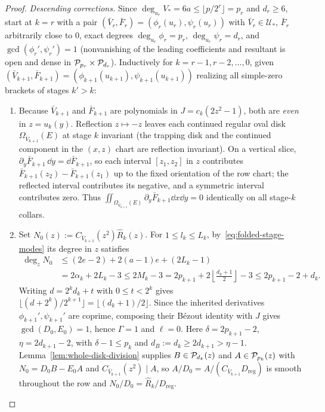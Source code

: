 \begin{proof}
\emph{Descending corrections.} Since $\deg_{u_r} V_* = 6a \le \lfloor p/2^r\rfloor = p_r$ and $d_r\ge 6$, start at $k=r$ with a pair $(\bar{V}_r,\bar{F}_r)=(\phi_r(u_r),\psi_r(u_r))$ with $\bar{V}_r\in\mathcal{U}_*$, $\bar{F}_r$ arbitrarily close to $0$, exact degrees $\deg_{u_r}\phi_r=p_r$, $\deg_{u_r}\psi_r=d_r$, and $\gcd(\phi_r',\psi_r')=1$ (nonvanishing of the leading coefficients and resultant is open and dense in $\mathcal{P}_{p_r}\times\mathcal{P}_{d_r}$). Inductively for $k=r-1,r-2,\dots,0$, given $(\bar{V}_{k+1},\bar{F}_{k+1})=(\phi_{k+1}(u_{k+1}),\psi_{k+1}(u_{k+1}))$ realizing all simple-zero brackets of stages $k'>k$:
\begin{enumerate}[label=\arabic*.,nosep]
  \item Because $\bar{V}_{k+1}$ and $\bar{F}_{k+1}$ are polynomials in $J=c_k(2z^2-1)$, both are \emph{even} in $z=u_k(y)$. Reflection $z\mapsto -z$ leaves each continued regular oval disk $\Omega_{\bar{V}_{k+1}}(E)$ at stage $k$ invariant (the trapping disk and the continued component in the $(x,z)$ chart are reflection invariant). On a vertical slice, $\partial_y\bar F_{k+1}\,\dd y=\dd\bar F_{k+1}$, so each interval $[z_1,z_2]$ in $z$ contributes $\bar F_{k+1}(z_2)-\bar F_{k+1}(z_1)$ up to the fixed orientation of the row chart; the reflected interval contributes its negative, and a symmetric interval contributes zero. Thus $\iint_{\Omega_{\bar{V}_{k+1}}(E)}\partial_y\bar{F}_{k+1}\dd x\dd y=0$ identically on all stage-$k$ collars.
  \item Set $N_0(z):=C_{\bar{V}_{k+1}}(z^2)\widehat{R}_k(z)$. For $1\le l_k\le L_k$, by~\eqref{eq:folded-stage-modes} its degree in $z$ satisfies
  \begin{align*}
    \deg_z N_0 &\le (2e-2) + 2(a-1)e + (2L_k-1) \\
    &= 2\alpha_k + 2L_k - 3 \le 2M_k - 3
     = 2p_{k+1} + 2\left\lfloor\frac{d_k+1}{2}\right\rfloor - 3 \le 2p_{k+1} - 2 + d_k.
  \end{align*}
  Writing $d=2^kd_k+t$ with $0\le t<2^k$ gives $\lfloor(d+2^k)/2^{k+1}\rfloor=\lfloor(d_k+1)/2\rfloor$. Since the inherited derivatives $\phi_{k+1}',\psi_{k+1}'$ are coprime, composing their B\'ezout identity with $J$ gives $\gcd(D_0,E_0)=1$, hence $\Gamma=1$ and $\ell=0$. Here $\delta=2p_{k+1}-2$, $\eta=2d_{k+1}-2$, with $\delta-1\le p_k$ and $d_B:=d_k\ge2d_{k+1}>\eta-1$. Lemma~\ref{lem:whole-disk-division} supplies $B\in\mathcal{P}_{d_k}(z)$ and $A\in\mathcal{P}_{p_k}(z)$ with $N_0=D_0 B - E_0 A$ and $C_{\bar{V}_{k+1}}(z^2)\mid A$, so $A/D_0=A/(C_{\bar{V}_{k+1}}D_{\mathrm{reg}})$ is smooth throughout the row and $N_0/D_0=\widehat{R}_k/D_{\mathrm{reg}}$.

\end{enumerate}
\end{proof}

